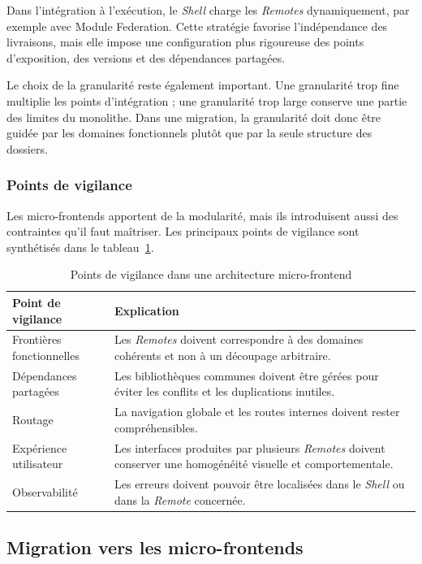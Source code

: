 Dans l'intégration à l'exécution, le \textit{Shell} charge les \textit{Remotes} dynamiquement, par exemple avec Module Federation. Cette stratégie favorise l'indépendance des livraisons, mais elle impose une configuration plus rigoureuse des points d'exposition, des versions et des dépendances partagées.

Le choix de la granularité reste également important. Une granularité trop fine multiplie les points d'intégration ; une granularité trop large conserve une partie des limites du monolithe. Dans une migration, la granularité doit donc être guidée par les domaines fonctionnels plutôt que par la seule structure des dossiers.

\subsubsection{Points de vigilance}

Les micro-frontends apportent de la modularité, mais ils introduisent aussi des contraintes qu'il faut maîtriser. Les principaux points de vigilance sont synthétisés dans le tableau~\ref{tab:vigilance-mfe}.

\begingroup
\renewcommand{\arraystretch}{1.25}
\begin{longtable}{|p{4cm}|p{10cm}|}
\caption{Points de vigilance dans une architecture micro-frontend}\label{tab:vigilance-mfe}\\
\hline
\textbf{Point de vigilance} & \textbf{Explication} \\
\hline
Frontières fonctionnelles & Les \textit{Remotes} doivent correspondre à des domaines cohérents et non à un découpage arbitraire. \\
\hline
Dépendances partagées & Les bibliothèques communes doivent être gérées pour éviter les conflits et les duplications inutiles. \\
\hline
Routage & La navigation globale et les routes internes doivent rester compréhensibles. \\
\hline
Expérience utilisateur & Les interfaces produites par plusieurs \textit{Remotes} doivent conserver une homogénéité visuelle et comportementale. \\
\hline
Observabilité & Les erreurs doivent pouvoir être localisées dans le \textit{Shell} ou dans la \textit{Remote} concernée. \\
\hline
\end{longtable}
\endgroup

\subsection{Migration vers les micro-frontends}

